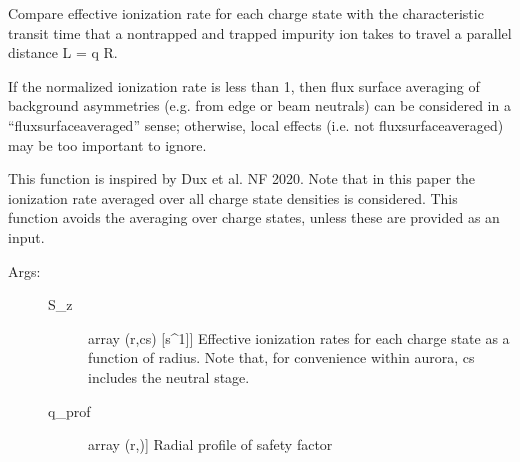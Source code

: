 \documentclass[letterpaper,10pt,english]{sphinxmanual}
\begin{document}
\begin{fulllineitems}
\label{\detokenize{aurora:aurora.plot_tools.get_ls_cycle}}
\end{fulllineitems}


\begin{fulllineitems}
\label{\detokenize{aurora:aurora.plot_tools.plot_norm_ion_freq}}
Compare effective ionization rate for each charge state with the 
characteristic transit time that a non\sphinxhyphen{}trapped and trapped impurity ion takes
to travel a parallel distance L = q R.

If the normalized ionization rate is less than 1, then flux surface averaging of
background asymmetries (e.g. from edge or beam neutrals) can be considered in a 
“flux\sphinxhyphen{}surface\sphinxhyphen{}averaged” sense; otherwise, local effects (i.e. not flux\sphinxhyphen{}surface\sphinxhyphen{}averaged)
may be too important to ignore.

This function is inspired by Dux et al. NF 2020. Note that in this paper the ionization 
rate averaged over all charge state densities is considered. This function avoids the 
averaging over charge states, unless these are provided as an input.
\begin{description}
\item[{Args:}] \leavevmode\begin{description}
\item[{S\_z}] \leavevmode{[}array (r,cs) {[}s\textasciicircum{}\sphinxhyphen{}1{]}{]}
Effective ionization rates for each charge state as a function of radius. 
Note that, for convenience within aurora, cs includes the neutral stage.

\item[{q\_prof}] \leavevmode{[}array (r,){]}
Radial profile of safety factor


\end{description}
\end{description}
\end{fulllineitems}
\end{document}

